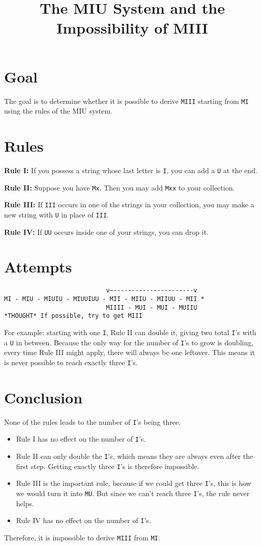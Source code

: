\documentclass[11pt]{article}
\title{The MIU System and the Impossibility of MIII}
\author{}
\date{}
\begin{document}
\maketitle

\section*{Goal}
The goal is to determine whether it is possible to derive \texttt{MIII} starting from \texttt{MI} using the rules of the MIU system.

\section*{Rules}
\textbf{Rule I:} If you possess a string whose last letter is \texttt{I}, you can add a \texttt{U} at the end.  

\textbf{Rule II:} Suppose you have \texttt{Mx}. Then you may add \texttt{Mxx} to your collection.  

\textbf{Rule III:} If \texttt{III} occurs in one of the strings in your collection, you may make a new string with \texttt{U} in place of \texttt{III}.  

\textbf{Rule IV:} If \texttt{UU} occurs inside one of your strings, you can drop it.  

\section*{Attempts}
\noindent
\begin{verbatim}
                            v—----------------------v
MI - MIU - MIUIU - MIUUIUU - MII - MIIU - MIIUU - MII *
                            MIIII - MUI - MUI - MUIIU
*THOUGHT* If possible, try to get MIII
\end{verbatim}

For example: starting with one \texttt{I}, Rule II can double it, giving two total \texttt{I}'s with a \texttt{U} in between. Because the only way for the number of \texttt{I}'s to grow is doubling, every time Rule III might apply, there will always be one leftover. This means it is never possible to reach exactly three \texttt{I}'s.

\section*{Conclusion}
None of the rules leads to the number of \texttt{I}'s being three.  

\begin{itemize}
    \item Rule I has no effect on the number of \texttt{I}'s.  
    \item Rule II can only double the \texttt{I}'s, which means they are always even after the first step. Getting exactly three \texttt{I}'s is therefore impossible.  
    \item Rule III is the important rule, because if we could get three \texttt{I}'s, this is how we would turn it into \texttt{MU}. But since we can’t reach three \texttt{I}'s, the rule never helps.  
    \item Rule IV has no effect on the number of \texttt{I}'s.  
\end{itemize}

Therefore, it is impossible to derive \texttt{MIII} from \texttt{MI}.
\end{document}
